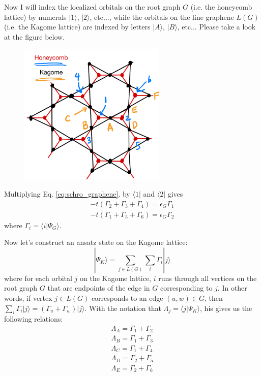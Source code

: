 \documentclass[a4paper,12pt]{article}
\begin{document}
Now I will index the localized orbitals on the root graph $G$ (i.e. the honeycomb lattice) by numerals $| 1 \rangle$, $| 2 \rangle$, etc..., while the orbitals on the line graphene $L(G)$ (i.e. the Kagome lattice) are indexed by letters $| A \rangle$, $| B \rangle$, etc...  Please take a look at the figure below.

\begin{figure}[h!]
\centering
\includegraphics[width=70mm,keepaspectratio=true]{line-graph.png}
\end{figure}

Multiplying Eq. \ref{eq:schro_graphene}. by $\langle 1 |$ and $\langle 2 |$ gives
\begin{align}
-t (\Gamma_2 + \Gamma_3 + \Gamma_4) = \epsilon_G \Gamma_1 \\
-t (\Gamma_1 + \Gamma_5 + \Gamma_6) = \epsilon_G \Gamma_2
\end{align}
where $\Gamma_i = \langle i | \Psi_G \rangle$.

Now let's construct an ansatz state on the Kagome lattice:
\begin{equation}
|\Psi_K \rangle = \sum_{j \in L(G)} \sum_{i} \Gamma_i | j \rangle
\end{equation}
where for each orbital $j$ on the Kagome lattice, $i$ runs through all vertices on the root graph $G$ that are endpoints of the edge in $G$ corresponding to $j$.  In other words, if vertex $j \in L(G)$ corresponds to an edge $(u, w) \in G$, then $\sum_i \Gamma_i | j \rangle = (\Gamma_u + \Gamma_w) | j \rangle$.  With the notation that $\Lambda_j = \langle j | \Psi_K \rangle$, his gives us the following relations:
\begin{align}
\Lambda_A = \Gamma_1 + \Gamma_2 \\
\Lambda_B = \Gamma_1 + \Gamma_3 \\
\Lambda_C = \Gamma_1 + \Gamma_4 \\
\Lambda_D = \Gamma_2 + \Gamma_5 \\
\Lambda_E = \Gamma_2 + \Gamma_6
\end{align}
\end{document}
